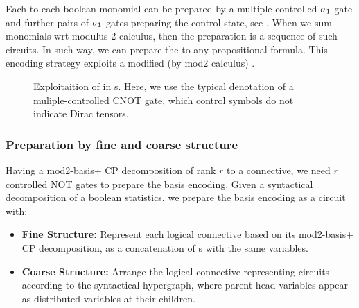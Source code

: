 Each \computationCircuit{} to each boolean monomial can be prepared by a multiple-controlled $\sigma_1$ gate and further pairs of $\sigma_1$ gates preparing the control state, see . %
When we sum monomials wrt modulus 2 calculus, then the preparation is a sequence of such circuits.
In such way, we can prepare the \computationCircuit{} to any propositional formula.
This encoding strategy exploits a modified (by mod2 calculus) \polynomialSparsity{}.

\begin{figure}
    \begin{center}
        
    \end{center}
    \caption{
        Exploitaition of \PolynomialSparsity{} in \computationCircuit{}s.
        Here, we use the typical denotation of a muliple-controlled CNOT gate, which control symbols do not indicate Dirac tensors.
    }\label{fig:qcbencodingPolynomial}
\end{figure}

\subsubsection{Preparation by fine and coarse structure}

Having a mod2-basis+ CP decomposition of rank $r$ to a connective, we need $r$ controlled NOT gates to prepare the basis encoding.
Given a syntactical decomposition of a boolean statistics, we prepare the basis encoding as a circuit with:
\begin{itemize}
    \item \textbf{Fine Structure:} Represent each logical connective based on its mod2-basis+ CP decomposition, as a concatenation of \computationCircuit{}s with the same variables.
    \item \textbf{Coarse Structure:} Arrange the logical connective representing circuits according to the syntactical hypergraph, where parent head variables appear as distributed variables at their children.
\end{itemize}